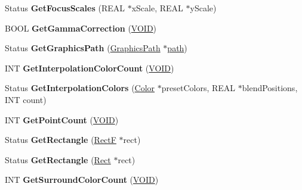 \begin{DoxyCompactItemize}
\item 
\mbox{\label{class_path_gradient_brush_a0d21c70a8126b1ccb5615034d9bac903}} 
Status {\bfseries Get\+Focus\+Scales} (R\+E\+AL $\ast$x\+Scale, R\+E\+AL $\ast$y\+Scale)
\item 
\mbox{\label{class_path_gradient_brush_a2638f0d6759a58a8722d0f3490bbdd88}} 
B\+O\+OL {\bfseries Get\+Gamma\+Correction} (\hyperlink{interfacevoid}{V\+O\+ID})
\item 
\mbox{\label{class_path_gradient_brush_ad74f8d1a51b4d6f9148b8fd62445cc92}} 
Status {\bfseries Get\+Graphics\+Path} (\hyperlink{class_graphics_path}{Graphics\+Path} $\ast$\hyperlink{structpath}{path})
\item 
\mbox{\label{class_path_gradient_brush_a7729e59bd254790ac83feb9778057bc1}} 
I\+NT {\bfseries Get\+Interpolation\+Color\+Count} (\hyperlink{interfacevoid}{V\+O\+ID})
\item 
\mbox{\label{class_path_gradient_brush_a4c526805166dfe2285736c5174e004d1}} 
Status {\bfseries Get\+Interpolation\+Colors} (\hyperlink{struct_color}{Color} $\ast$preset\+Colors, R\+E\+AL $\ast$blend\+Positions, I\+NT count)
\item 
\mbox{\label{class_path_gradient_brush_ac879b8b8423c95c9cf0e2a53f98f35b5}} 
I\+NT {\bfseries Get\+Point\+Count} (\hyperlink{interfacevoid}{V\+O\+ID})
\item 
\mbox{\label{class_path_gradient_brush_aac72851fe9f92fe485eb9895fab29b54}} 
Status {\bfseries Get\+Rectangle} (\hyperlink{struct_rect_f}{RectF} $\ast$rect)
\item 
\mbox{\label{class_path_gradient_brush_a76a11eb4ce231c2705a7f77e9b100307}} 
Status {\bfseries Get\+Rectangle} (\hyperlink{struct_rect}{Rect} $\ast$rect)
\item 
\mbox{\label{class_path_gradient_brush_aae1eea9c138511d3a6caf0ea13578291}} 
I\+NT {\bfseries Get\+Surround\+Color\+Count} (\hyperlink{interfacevoid}{V\+O\+ID})

\end{DoxyCompactItemize}
